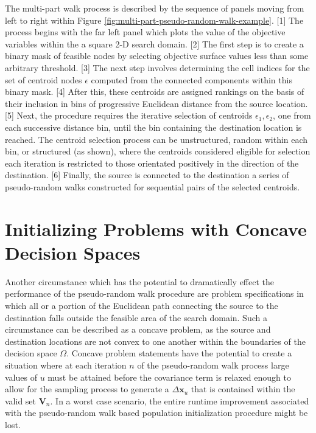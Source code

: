 The multi-part walk process is described by the sequence of panels moving from left to right within Figure \ref{fig:multi-part-pseudo-random-walk-example}. [1] The process begins with the far left panel which plots the value of the objective variables within the a square 2-D search domain. [2] The first step is to create a binary mask of feasible nodes by selecting objective surface values less than some arbitrary threshold. [3] The next step involves determining the cell indices for the set of centroid nodes $\epsilon$ computed from the connected components within this binary mask. [4] After this, these centroids are assigned rankings on the basis of their inclusion in bins of progressive Euclidean distance from the source location. [5] Next, the procedure requires the iterative selection of centroids $\epsilon_1, \epsilon_2$, one from each successive distance bin, until the bin containing the destination location is reached. The centroid selection process can be unstructured, random within each bin, or structured (as shown), where the centroids considered eligible for selection each iteration is restricted to those orientated positively in the direction of the destination. [6] Finally, the source is connected to the destination a series of pseudo-random walks constructed for sequential pairs of the selected centroids.
            
\section{Initializing Problems with Concave Decision Spaces}
            
Another circumstance which has the potential to dramatically effect the performance of the pseudo-random walk procedure are problem specifications in which all or a portion of the Euclidean path connecting the source to the destination falls outside the feasible area of the search domain. Such a circumstance can be described as a concave problem, as the source and destination locations are not convex to one another within the boundaries of the decision space $\Omega$. Concave problem statements have the potential to create a situation where at each iteration $n$ of the pseudo-random walk process large values of $u$ must be attained before the covariance term is relaxed enough to allow for the sampling process to generate a $\Delta\textbf{x}_u$ that is contained within the valid set $\textbf{V}_n$. In a worst case scenario, the entire runtime improvement associated with the pseudo-random walk based population initialization procedure might be lost.

